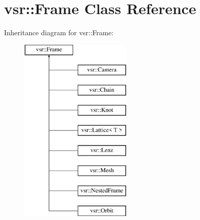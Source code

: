 \hypertarget{classvsr_1_1_frame}{\section{vsr\-:\-:Frame Class Reference}
\label{classvsr_1_1_frame}
}
Inheritance diagram for vsr\-:\-:Frame\-:\begin{figure}[H]
\begin{center}
\leavevmode
\includegraphics[height=9.000000cm]{classvsr_1_1_frame}
\end{center}
\end{figure}
